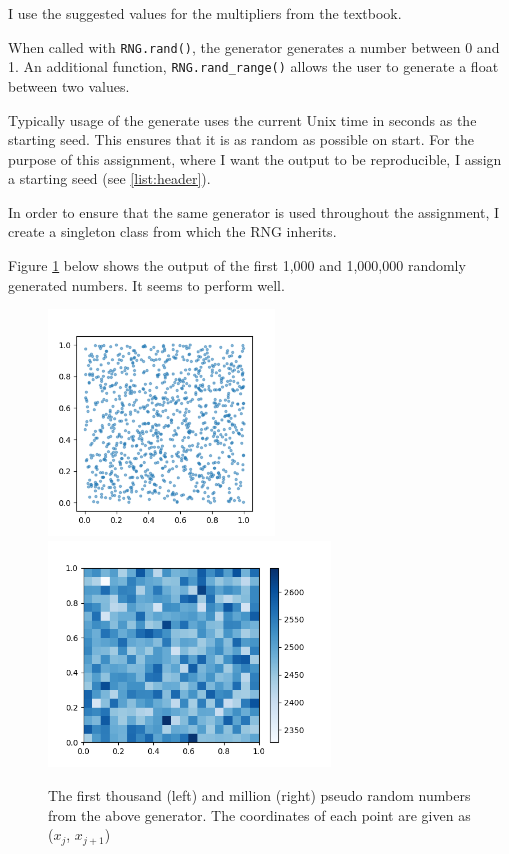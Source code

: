     I use the suggested values for the multipliers from the textbook.

    When called with \texttt{RNG.rand()}, the generator generates a number between 0 and 1. An additional function, \texttt{RNG.rand\_range()} allows the user to generate a float between two values.

    Typically usage of the generate uses the current Unix time in seconds as the starting seed. This ensures that it is as random as possible on start. For the purpose of this assignment, where I want the output to be reproducible, I assign a starting seed (see \ref{list:header}).

    In order to ensure that the same generator is used throughout the assignment, I create a singleton class from which the RNG inherits. 

    Figure \ref{fig:rng} below shows the output of the first 1,000 and 1,000,000 randomly generated numbers. It seems to perform well.

    

    \newpage
    
    
    \begin{figure}[H]
        \centering
        \includegraphics[height=6cm]{output/1b_RNG-scatter.png}
        \includegraphics[height=6cm]{output/1b_RNG-hist2d.png}
        \caption{The first thousand (left) and million (right) pseudo random numbers from the above generator. The coordinates of each point are given as  ($x_j$, $x_{j+1}$)}
        \label{fig:rng}
    \end{figure}
